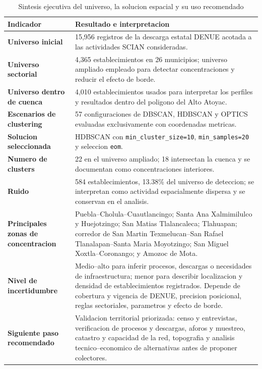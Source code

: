 \documentclass[11pt,letterpaper]{article}
\begin{document}
\begin{table}[H]
\centering
\caption{Sintesis ejecutiva del universo, la solucion espacial y su uso recomendado}
\label{tab:sintesis-ejecutiva}
\small
\begin{tabularx}{\textwidth}{>{\bfseries}p{}X}
\toprule
Indicador & Resultado e interpretacion \\
\midrule
Universo inicial & 15,956 registros de la descarga estatal DENUE acotada a las actividades SCIAN consideradas. \\
Universo sectorial & 4,365 establecimientos en 26 municipios; universo ampliado empleado para detectar concentraciones y reducir el efecto de borde. \\
Universo dentro de cuenca & 4,010 establecimientos usados para interpretar los perfiles y resultados dentro del poligono del Alto Atoyac. \\
Escenarios de clustering & 57 configuraciones de DBSCAN, HDBSCAN y OPTICS evaluadas exclusivamente con coordenadas metricas. \\
Solucion seleccionada & HDBSCAN con \texttt{min\_cluster\_size=10}, \texttt{min\_samples=20} y seleccion \texttt{eom}. \\
Numero de clusters & 22 en el universo ampliado; 18 intersectan la cuenca y se documentan como concentraciones interiores. \\
Ruido & 584 establecimientos, 13.38\% del universo de deteccion; se interpretan como actividad espacialmente dispersa y se conservan en el analisis. \\
Principales zonas de concentracion & Puebla--Cholula--Cuautlancingo; Santa Ana Xalmimilulco y Huejotzingo; San Matias Tlalancaleca; Tlahuapan; corredor de San Martin Texmelucan--San Rafael Tlanalapan--Santa Maria Moyotzingo; San Miguel Xoxtla--Coronango; y Amozoc de Mota. \\
Nivel de incertidumbre & Medio--alto para inferir procesos, descargas o necesidades de infraestructura; menor para describir localizacion y densidad de establecimientos registrados. Depende de cobertura y vigencia de DENUE, precision posicional, reglas sectoriales, parametros y efecto de borde. \\
Siguiente paso recomendado & Validacion territorial priorizada: censo y entrevistas, verificacion de procesos y descargas, aforos y muestreo, catastro y capacidad de la red, topografia y analisis tecnico--economico de alternativas antes de proponer colectores. \\
\bottomrule
\end{tabularx}
\end{table}
\end{document}
